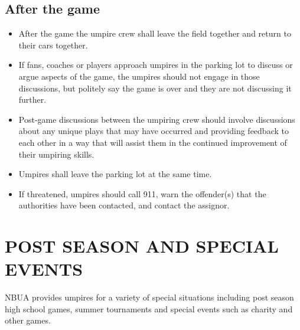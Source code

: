 \documentclass[letterpaper,11pt,colorlinks=true,allcolors=blue]{article}
\begin{document}
\subsection*{After the game}
\begin{itemize}
\item After the game the umpire crew shall leave the field together and return to their cars together.
\item If fans, coaches or players approach umpires in the parking lot to discuss or argue aspects of the game, the umpires should not engage in those discussions, but politely say the game is over and they are not discussing it further.
\item Post-game discussions between the umpiring crew should involve discussions about any unique plays that may have occurred and providing feedback to each other in a way that will assist them in the continued improvement of their umpiring skills.
\item Umpires shall leave the parking lot at the same time.
\item If threatened, umpires should call 911, warn the offender(s) that the authorities have been contacted, and contact the assignor.
\end{itemize}

\newpage
\section{POST SEASON AND SPECIAL EVENTS}

NBUA provides umpires for a variety of special situations including post season high school games, summer tournaments and special events such as charity and other games. 
\end{document}
